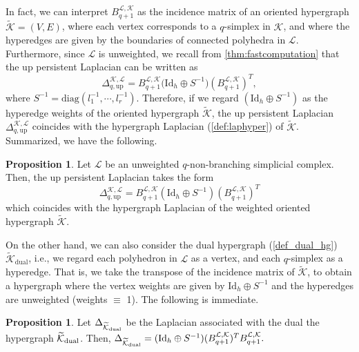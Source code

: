 \documentclass{article}
\theoremstyle{definition}
\newtheorem{proposition}[theorem]{Proposition}
\newcommand{\diag}{\mathrm{diag}}
\newcommand{\KK}{\mathcal{K}}
\newcommand{\LL}{\mathcal{L}}
\newcommand{\id}{\mathrm{Id}}
\begin{document}
In fact, we can interpret $B_{q+1}^{\LL, \KK}$ as the incidence matrix of an oriented  hypergraph $\widetilde{\KK}=(V, E)$, where each vertex corresponds to a $q$-simplex in $\KK$, and where the hyperedges are given by the boundaries of connected polyhedra in $\LL$.  Furthermore, since $\LL$ is unweighted, we recall from \cref{thm:fastcomputation} that
the up persistent Laplacian can be written as
\[
\Delta_{q, \mathrm{up}}^{\KK, \LL}
=
B_{q+1}^{\LL, \KK} \big(\id_h\oplus S^{-1}\big)\left(B_{q+1}^{\LL, \KK}\right)^{T},
\]
where $S^{-1}=\diag(l_1^{-1}, \cdots, l_r^{-1})$.
Therefore, if we regard $(\id_h\oplus S^{-1})$ as the hyperedge weights of the oriented hypergraph $\widetilde{\KK}$, the up persistent Laplacian $\Delta_{q, \mathrm{up}}^{\KK, \LL}$ coincides with the hypergraph Laplacian (\cref{def:laphyper}) of $\widetilde{\KK}$.
Summarized, we have the following.
\begin{proposition}\label{prop:cheeger}
Let $\LL$ be an unweighted $q$-non-branching simplicial complex. Then, the up persistent Laplacian takes the form
 \[\Delta_{q, \mathrm{up}}^{\KK, \LL}=B_{q+1}^{\LL, \KK}\left(\id_h\oplus S^{-1}\right)(B_{q+1}^{\LL, \KK})^T\]
which coincides with the hypergraph Laplacian of the weighted oriented hypergraph $\widetilde{\KK}$.
\end{proposition}


On the other hand,
we can also consider the dual hypergraph (\cref{def_dual_hg}) $\widetilde{\KK}_{\textrm{dual}}$,
i.e.,
we regard each polyhedron in $\LL$ as a vertex, and each $q$-simplex as a hyperedge. That is, we take the transpose of the incidence matrix of $\widetilde{\KK}$, to obtain a hypergraph where the vertex weights are given by $\id_h\oplus S^{-1}$ and the hyperedges are unweighted (weights $\equiv$ 1). The following is immediate.

\begin{proposition}
Let $\Delta_{\widetilde{\KK}_{\textrm{\textrm{dual}}}}$ be the Laplacian associated with the dual the hypergraph $\widetilde{\KK}_{\textrm{\textrm{dual}}}$.
Then, $
\Delta_{\widetilde{\KK}_{\textrm{\textrm{dual}}}}
=
(\id_h\oplus S^{-1})(B_{q+1}^{\LL, \KK})^TB_{q+1}^{\LL, \KK}.$
\end{proposition}
\end{document}
